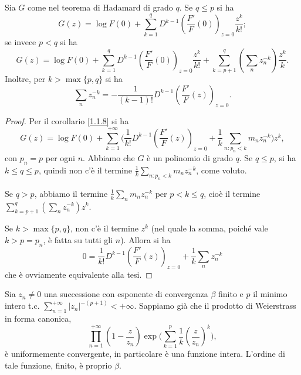 \begin{cor} \label{1.2.14}
  Sia $G$ come nel teorema di Hadamard di grado $q$. Se $q \le p$ si ha
  $$G(z)=\log{F(0)}+\sum_{k=1}^q D^{k-1}\left(\frac{F'}{F}(0)\right)_{z=0} \frac{z^k}{k!};$$
  se invece $p<q$ si ha
  $$G(z)=\log{F(0)}+\sum_{k=1}^q D^{k-1}\left(\frac{F'}{F}(0)\right)_{z=0}\frac{z^k}{k!}+\sum_{k=p+1}^q\left(\sum_n z_n^{-k}\right)\frac{z^k}{k}.$$
  Inoltre, per $k>\max\{p,q\}$ si ha
  $$\sum_n z_n^{-k}=-\frac{1}{(k-1)!}D^{k-1}\left(\frac{F'}{F}(z)\right)_{z=0}.$$
\end{cor}

\begin{proof}
  Per il corollario \ref{1.1.8} si ha
  $$G(z)=\log{F(0)}+\sum_{k=1}^{+\infty}\Bigg(\frac{1}{k!}D^{k-1}\left(\frac{F'}{F}(z)\right)_{z=0}+\frac{1}{k}\sum_{n:p_n<k}m_nz_n^{-k}\Bigg)z^k,$$
  con $p_n=p$ per ogni $n$. Abbiamo che $G$ è un polinomio di grado $q$. Se $q \le p$, si ha $k \le q \le p$, quindi non c'è il termine $\displaystyle \frac{1}{k}\sum_{n:p_n<k}m_nz_n^{-k}$, come voluto.

  Se $q>p$, abbiamo il termine $\displaystyle \frac{1}{k}\sum_n m_nz_n^{-k}$ per $p<k \le q$, cioè il termine $\displaystyle \sum_{k=p+1}^q\left(\sum_n z_n^{-k}\right)z^k$.

  Se $k>\max\{p,q\}$, non c'è il termine $z^k$ (nel quale la somma, poiché vale $k>p=p_n$, è fatta su tutti gli $n$). Allora si ha
  $$0=\frac{1}{k!}D^{k-1}\left(\frac{F'}{F}(z)\right)_{z=0}+\frac{1}{k}\sum_n z_n^{-k}$$
  che è ovviamente equivalente alla tesi.
\end{proof}

\begin{thm} \label{1.2.15}
  Sia $z_n\not=0$ una successione con esponente di convergenza $\beta$ finito e $p$ il minimo intero t.c. $\displaystyle \sum_{n=1}^{+\infty} |z_n|^{-(p+1)}<+\infty$. Sappiamo già che il prodotto di Weierstrass in forma canonica,
  $$\prod_{n=1}^{+\infty} \left(1-\frac{z}{z_n}\right)\exp\Bigg(\sum_{k=1}^p\frac{1}{k}\left(\frac{z}{z_n}\right)^k\Bigg),$$
  è uniformemente convergente, in particolare è una funzione intera. L'ordine di tale funzione, finito, è proprio $\beta$.
\end{thm}

